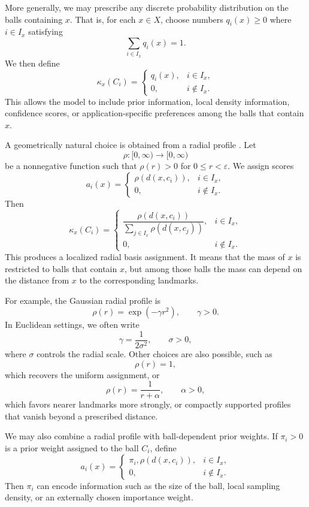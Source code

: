 \documentclass[9pt,a4paper,twocolumn,twoside]{extarticle}
\theoremstyle{definition}
\begin{document}
More generally, we may prescribe any discrete probability distribution on the balls containing $x$. That is, for each $x\in X$, choose numbers $q_i(x) \ge 0$ where $i \in I_x$ satisfying
\[
\sum_{i\in I_x}q_i(x)=1.
\]
We then define
\[
\kappa_x({C_i}) =
\begin{cases}
q_i(x), & i\in I_x,\\
0, & i\notin I_x.
\end{cases}
\]
This allows the model to include prior information, local density information, confidence scores, or application-specific preferences among the balls that contain $x$.

A geometrically natural choice is obtained from a radial profile \cite{buhmann2003radial}. Let
\[
\rho:[0,\infty)\to[0,\infty)
\]
be a nonnegative function such that $\rho(r) > 0$ for $0 \le r <\varepsilon$. We assign scores
\[
a_i(x) =
\begin{cases}
\rho(d(x,c_i)), & i\in I_x,\\
0, & i\notin I_x.
\end{cases}
\]
Then
\[
\kappa_x({C_i}) =
\begin{cases}
\dfrac{\rho(d(x,c_i))}{\sum_{j\in I_x}\rho(d(x,c_j))}, & i\in I_x,\\[1.2em]
0, & i\notin I_x.
\end{cases}
\]
This produces a localized radial basis assignment. It means that the mass of $x$ is restricted to balls that contain $x$, but among those balls the mass can depend on the distance from $x$ to the corresponding landmarks.

For example, the Gaussian radial profile is
\[
\rho(r)=\exp(-\gamma r^2), \qquad \gamma>0.
\]
In Euclidean settings, we often write
\[
\gamma=\frac{1}{2\sigma^2}, \qquad \sigma>0,
\]
where $\sigma$ controls the radial scale. Other choices are also possible, such as
\[
\rho(r)=1,
\]
which recovers the uniform assignment, or
\[
\rho(r)=\frac{1}{r+\alpha},
\qquad \alpha>0,
\]
which favors nearer landmarks more strongly, or compactly supported profiles that vanish beyond a prescribed distance.

We may also combine a radial profile with ball-dependent prior weights. If $\pi_i>0$ is a prior weight assigned to the ball $C_i$, define
\[
a_i(x) =
\begin{cases}
\pi_i,\rho(d(x,c_i)), & i\in I_x,\\
0, & i\notin I_x.
\end{cases}
\]
Then $\pi_i$ can encode information such as the size of the ball, local sampling density, or an externally chosen importance weight.
\end{document}
